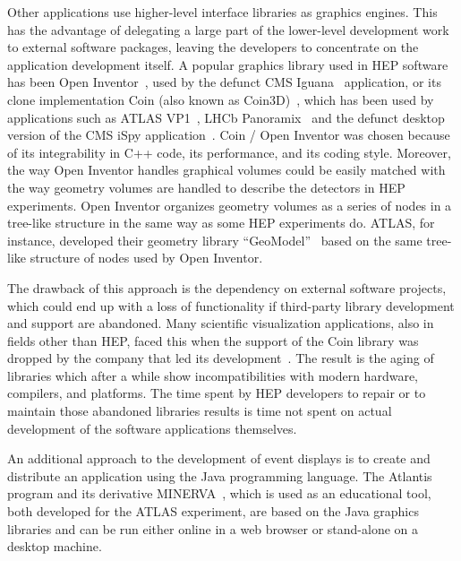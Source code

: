\documentclass[12pt,a4paper]{article}
\begin{document}
Other applications use higher-level interface libraries as graphics engines. This has the advantage of delegating
a large part of the lower-level development work to external software packages, leaving the developers to concentrate
on the application development itself. A popular graphics library used in HEP software has been
Open Inventor~\cite{OpenInventor1993}, used by the defunct CMS Iguana~\cite{CMSIguanaPaperNIM,CMSIguana} application, or
its clone implementation Coin (also known as Coin3D)~\cite{Coin3D}, which has been used by applications such
as ATLAS VP1~\cite{ATLASVP12010}, LHCb Panoramix~\cite{LHCbPanoramix} and the defunct desktop version of the
CMS iSpy application~\cite{CMSISpy}. Coin / Open Inventor was
chosen because of its integrability in C++ code, its performance, and its coding style. Moreover, the way Open Inventor handles
graphical volumes could be easily matched with the way geometry volumes are handled to describe the detectors in HEP experiments.
Open Inventor organizes geometry volumes as a series of nodes in a tree-like structure in the same way as some
HEP experiments do. ATLAS, for instance, developed their geometry library “GeoModel”~\cite{ATLASGeoModel2004} based on
the same tree-like structure of nodes used by Open Inventor.

The drawback of this approach is the dependency on external software projects, which could end up with a loss of functionality if
third-party library development and support are abandoned. Many scientific visualization applications, also in fields other than
HEP, faced this when the support of the Coin library was dropped by the company that led its development~\cite{CoinEndOfLifeLetter}.
The result is the aging of libraries which after a while show incompatibilities with modern hardware, compilers, and platforms. The time
spent by HEP developers to repair or to maintain those abandoned libraries results is time not spent on actual development
of the software applications themselves.

An additional approach to the development of event displays is to create and distribute an application using the Java programming language.
The Atlantis~\cite{ATLASAtlantis} program and its derivative MINERVA~\cite{ATLASMinerva}, which is used as an educational tool,
both developed for the ATLAS experiment, are based on the Java graphics libraries and can be run either online in a web browser
or stand-alone on a desktop machine.
\end{document}
